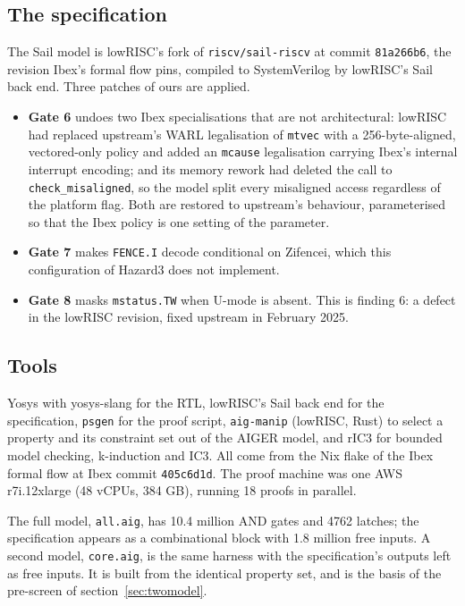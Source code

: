 \documentclass[11pt]{article}
\newcommand{\code}[1]{\texttt{#1}}
\begin{document}
\subsection{The specification}

The Sail model is lowRISC's fork of \code{riscv/sail-riscv} at commit
\code{81a266b6}, the revision Ibex's formal flow pins, compiled to
SystemVerilog by lowRISC's Sail back end. Three patches of ours are applied.

\begin{itemize}
\item \textbf{Gate 6} undoes two Ibex specialisations that are not
  architectural: lowRISC had replaced upstream's WARL legalisation of
  \code{mtvec} with a 256-byte-aligned, vectored-only policy and added an
  \code{mcause} legalisation carrying Ibex's internal interrupt encoding; and
  its memory rework had deleted the call to \code{check\_misaligned}, so the
  model split every misaligned access regardless of the platform flag. Both
  are restored to upstream's behaviour, parameterised so that the Ibex policy
  is one setting of the parameter.
\item \textbf{Gate 7} makes \code{FENCE.I} decode conditional on Zifencei,
  which this configuration of Hazard3 does not implement.
\item \textbf{Gate 8} masks \code{mstatus.TW} when U-mode is absent. This is
  finding 6: a defect in the lowRISC revision, fixed upstream in February 2025.
\end{itemize}

\subsection{Tools}

Yosys with yosys-slang for the RTL, lowRISC's Sail back end for the
specification, \code{psgen} for the proof script, \code{aig-manip} (lowRISC,
Rust) to select a property and its constraint set out of the AIGER model, and
rIC3 for bounded model checking, k-induction and IC3. All come from the Nix
flake of the Ibex formal flow at Ibex commit \code{405c6d1d}. The proof
machine was one AWS r7i.12xlarge (48 vCPUs, 384 GB), running 18 proofs in
parallel.

The full model, \code{all.aig}, has 10.4 million AND gates and 4762 latches;
the specification appears as a combinational block with 1.8 million free
inputs. A second model, \code{core.aig}, is the same harness with the
specification's outputs left as free inputs. It is built from the identical
property set, and is the basis of the pre-screen of section~\ref{sec:twomodel}.
\end{document}
